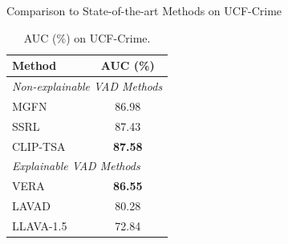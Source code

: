 \documentclass[aspectratio=169,xcolor=dvipsnames]{beamer}
\begin{document}
	\begin{frame}{Comparison to State-of-the-art Methods on UCF-Crime}
		\small
		\begin{table}
			\centering
			\renewcommand{\arraystretch}{1.15}
			\setlength{\tabcolsep}{7pt}
			\begin{tabular}{l c}
				\toprule
				\textbf{Method} & \textbf{AUC (\%)} \\
				\midrule
				\multicolumn{2}{l}{\textit{Non-explainable VAD Methods}} \\
				MGFN & 86.98 \\
				SSRL & 87.43 \\
				CLIP-TSA & \textbf{87.58} \\
				\midrule
				\multicolumn{2}{l}{\textit{Explainable VAD Methods}} \\
				VERA & \textbf{86.55} \\
				LAVAD & 80.28 \\
				LLAVA-1.5 & 72.84 \\
				\bottomrule
			\end{tabular}
			\caption{AUC (\%) on UCF-Crime.}
		\end{table}
		
		\vspace{-0.5em}
		
	\end{frame}
	
\end{document}
